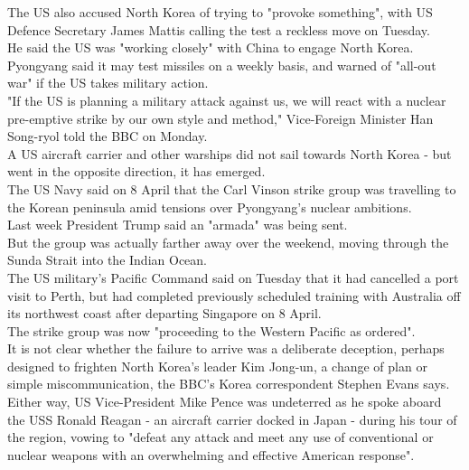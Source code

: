\documentclass[runningheads,a4paper]{llncs}
\begin{document}
\begin{CJK*}{UTF8}{gbsn}
The US also accused North Korea of trying to "provoke something", with US Defence Secretary James Mattis calling the test a reckless move on Tuesday.\\
He said the US was "working closely" with China to engage North Korea.\\
Pyongyang said it may test missiles on a weekly basis, and warned of "all-out war" if the US takes military action.\\
"If the US is planning a military attack against us, we will react with a nuclear pre-emptive strike by our own style and method," Vice-Foreign Minister Han Song-ryol told the BBC on Monday.\\
A \colorbox{green!30}{US} \colorbox{green!30}{aircraft carrier} and other \colorbox{red!30}{warships} did not sail towards \colorbox{green!30}{North Korea} - but went in the opposite direction, it has emerged.\\
The \colorbox{green!30}{US}\colorbox{blue!30}{ Navy} said on 8 April that the \colorbox{red!30}{Carl Vinson strike group} was travelling to the Korean peninsula amid tensions over Pyongyang's nuclear ambitions.\\
Last week \colorbox{blue!30}{President Trump} said an "armada" was being sent.\\
But the group was actually farther away over the weekend, moving through \colorbox{blue!30}{the }\colorbox{green!30}{Sunda Strait} into the \colorbox{red!30}{Indian Ocean}.\\
The \colorbox{green!30}{US} military's \colorbox{blue!30}{Pacific }\colorbox{green!30}{Command} said on Tuesday that it had cancelled a port visit to\colorbox{red!30}{ }\colorbox{green!30}{Perth}, but had completed previously scheduled training with \colorbox{blue!30}{Australia} off its northwest coast after departing \colorbox{green!30}{Singapore} on 8 April.\\
The strike group was now "proceeding to \colorbox{blue!30}{the Western Pacific} as ordered".\\
It is not clear whether the failure to arrive was a deliberate deception, perhaps designed to frighten North Korea's leader \colorbox{red!30}{Kim Jong-un}, a change of plan or simple miscommunication, the \colorbox{red!30}{BBC's Korea correspondent Stephen Evans} says.\\
Either way, US Vice-President Mike Pence was undeterred as he spoke aboard the USS Ronald Reagan - an aircraft carrier docked in Japan - during his tour of the region, vowing to "defeat any attack and meet any use of conventional or nuclear weapons with an overwhelming and effective American response".\\

\end{CJK*}
\end{document}
